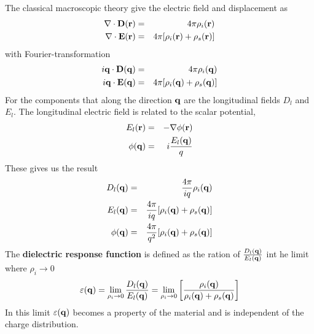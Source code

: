 The classical macroscopic theory give the electric field and displacement as
\begin{eqnarray}
    \nabla \cdot \mathbf{D}(\mathbf{r}) &=& 4\pi \rho_i(\mathbf{r}) \label{5.90} \\
    \nabla \cdot \mathbf{E}(\mathbf{r}) &=& 4\pi [ \rho_i(\mathbf{r}) + \rho_s(\mathbf{r})] \label{5.91}
\end{eqnarray}
with Fourier-transformation
\begin{eqnarray}
    i\mathbf{q} \cdot \mathbf{D}(\mathbf{q}) &=& 4 \pi \rho_i(\mathbf{q}) \label{5.92} \\
    i\mathbf{q} \cdot \mathbf{E}(\mathbf{q}) &=& 4 \pi [ \rho_i(\mathbf{q}) + \rho_s(\mathbf{q}) ] \label{5.93}
\end{eqnarray}
For the components that along the direction $\mathbf{q}$ are the longitudinal fields $D_l$ and $E_l$.
The longitudinal electric field is related to the scalar potential,
\begin{eqnarray}
    E_l(\mathbf{r}) &=& - \nabla \phi(\mathbf{r}) \\
    \phi(\mathbf{q}) &=& i \frac{E_l(\mathbf{q})}{q}
\end{eqnarray}
These gives us the result
\begin{eqnarray}
    D_l(\mathbf{q}) &=& \frac{4\pi}{iq} \rho_i(\mathbf{q})    \label{5.94} \\
    E_l(\mathbf{q}) &=& \frac{4\pi}{iq} [\rho_i(\mathbf{q}) + \rho_s(\mathbf{q})] \label{5.95} \\
    \phi(\mathbf{q}) &=& \frac{4\pi}{q^2} [ \rho_i(\mathbf{q}) + \rho_s(\mathbf{q})] \label{5.96}
\end{eqnarray}
The \textbf{dielectric response function} is defined as the ration of $ \frac{D_l(\mathbf{q})}{E_l(\mathbf{q})} $ int he limit where $\rho_i \to 0$
\begin{equation}
    \varepsilon(\mathbf{q}) = \lim_{\rho_i \to 0} \frac{D_l(\mathbf{q})}{E_l(\mathbf{q})} = \lim_{\rho_i \to 0} \left[ \frac{\rho_i(\mathbf{q})}{\rho_i(\mathbf{q})+ \rho_s(\mathbf{q})} \right]  \label{5.97}
\end{equation}
In this limit $\varepsilon(\mathbf{q})$ becomes a property of the material and is independent of the charge distribution.

